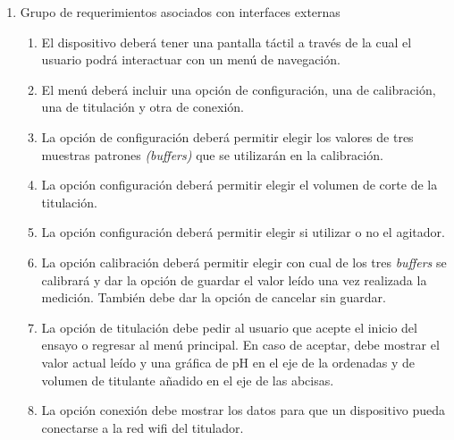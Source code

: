 \documentclass[11pt]{charter}
\begin{document}
\begin{enumerate}
\item Grupo de requerimientos asociados con interfaces externas
	\begin{enumerate}
	\item El dispositivo deberá tener una pantalla táctil a través de la cual el usuario podrá interactuar con un menú de navegación.
	\item El menú deberá incluir una opción de configuración, una de calibración, una de titulación y otra de conexión.
	\item La opción de configuración deberá permitir elegir los valores de tres muestras patrones \textit{(buffers)} que se utilizarán en la calibración.
	\item La opción configuración deberá permitir elegir el volumen de corte de la titulación.
	\item La opción configuración deberá permitir elegir si utilizar o no el agitador.
	\item La opción calibración deberá permitir elegir con cual de los tres \textit{buffers} se calibrará y dar la opción de guardar el valor leído una vez realizada la medición. También debe dar la opción de cancelar sin guardar.
	\item La opción de titulación debe pedir al usuario que acepte el inicio del ensayo o regresar al menú principal. En caso de aceptar, debe mostrar el valor actual leído y una gráfica de pH en el eje de la ordenadas y de volumen de titulante añadido en el eje de las abcisas.
	\item La opción conexión debe mostrar los datos para que un dispositivo pueda conectarse a la red wifi del titulador. 
	\end{enumerate}
	

\end{enumerate}
\end{document}
